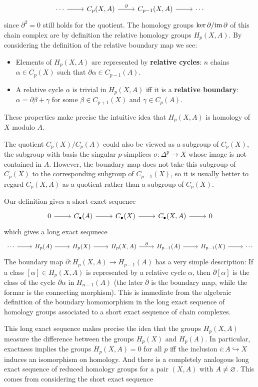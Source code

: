 \[\begin{tikzcd}
\cdots\ar[r]&C_p(X,A)\ar[r,"\partial"]&C_{p-1}(X,A)\ar[r]&\cdots
\end{tikzcd}\]
since $\partial^2=0$ still holds for the quotient. The homology groups $\mathrm{ker}\,\partial/\mathrm{im}\,\partial$ of this chain complex are by definition the relative homology groups $H_p(X,A)$. By considering the definition of the relative boundary map we see:
\begin{itemize}
\item Elements of $H_p(X,A)$ are represented by \textbf{relative cycles}: $n$ chains $\alpha\in C_p(X)$ such that $\partial\alpha\in C_{p-1}(A)$.
\item A relative cycle $\alpha$ is trivial in $H_p(X,A)$ iff it is a \textbf{relative boundary}: $\alpha=\partial\beta+\gamma$ for some $\beta\in C_{p+1}(X)$ and $\gamma\in C_p(A)$.
\end{itemize}
These properties make precise the intuitive idea that $H_p(X,A)$ is homology of $X$ modulo $A$.\par
The quotient $C_p(X)/C_p(A)$ could also be viewed as a subgroup of $C_p(X)$, the subgroup with basis the singular $p$-simplices $\sigma:\Delta^p\to X$ whose image is not contained in $A$. However, the boundary map does not take this subgroup of $C_p(X)$ to the corresponding subgroup of $C_{p-1}(X)$, so it is usually better to regard $C_p(X,A)$ as a quotient rather than a subgroup of $C_p(X)$.\par
Our definition gives a short exact sequence
\[\begin{tikzcd}
0\ar[r]&C_\bullet(A)\ar[r]&C_\bullet(X)\ar[r]&C_\bullet(X,A)\ar[r]&0
\end{tikzcd}\]
which gives a long exact sequnece
\[\begin{tikzcd}
\cdots\ar[r]&H_p(A)\ar[r]&H_p(X)\ar[r]&H_p(X,A)\ar[r,"\partial"]&H_{p-1}(A)\ar[r]&H_{p-1}(X)\ar[r]&\cdots
\end{tikzcd}\]
The boundary map $\partial:H_p(X,A)\to H_{p-1}(A)$ has a very simple description: If a class $[\alpha]\in H_p(X,A)$ is represented by a relative cycle $\alpha$, then $\partial[\alpha]$ is the class of the cycle $\partial\alpha$ in $H_{n-1}(A)$ (the later $\partial$ is the boundary map, while the formar is the connecting morphism). This is immediate from the algebraic definition of the boundary homomorphism in the long exact sequence of homology groups associated to a short exact sequence of chain complexes.\par
This long exact sequence makes precise the idea that the groups $H_p(X,A)$ measure the difference between the groups $H_p(X)$ and $H_p(A)$. In particular, exactness implies the groups $H_p(X,A)=0$ for all $p$ iff the inclusion $i:A\hookrightarrow X$ induces an isomorphism on homology. And there is a completely analogous long exact sequence of reduced homology groups for a pair $(X,A)$ with $A\neq\varnothing$. This comes from considering the short exact sequence
